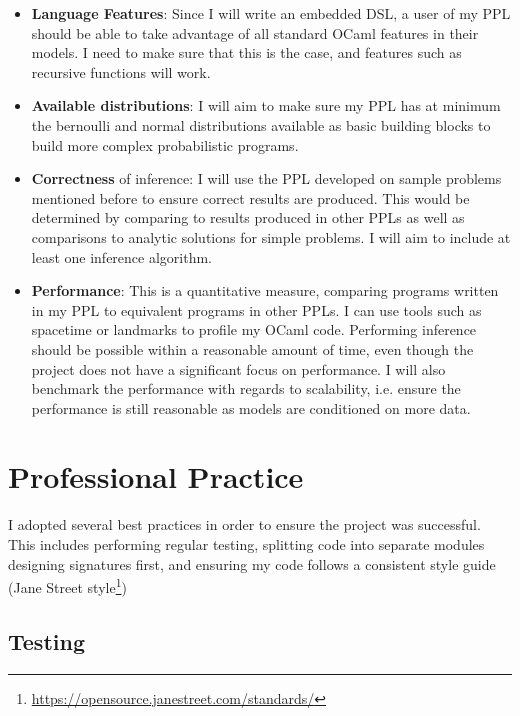 \begin{itemize}
    \item \textbf{Language Features}: Since I will write an embedded DSL, a user of my PPL should be able to take advantage of all standard OCaml features in their models. I need to make sure that this is the case, and features such as recursive functions will work.
    \item \textbf{Available distributions}: I will aim to make sure my PPL has at minimum the bernoulli and normal distributions available as basic building blocks to build more complex probabilistic programs.
    \item \textbf{Correctness} of inference: I will use the PPL developed on sample problems mentioned before to ensure correct results are produced. This would be determined by comparing to results produced in other PPLs as well as comparisons to analytic solutions for simple problems. I will aim to include at least one inference algorithm.
    \item \textbf{Performance}: This is a quantitative measure, comparing programs written in my PPL to equivalent programs in other PPLs. I can use tools such as spacetime or landmarks to profile my OCaml code. Performing inference should be possible within a reasonable amount of time, even though the project does not have a significant focus on performance. I will also benchmark the performance with regards to scalability, i.e. ensure the performance is still reasonable as models are conditioned on more data.
\end{itemize}



\section{Professional Practice}

I adopted several best practices in order to ensure the project was successful. This includes performing regular testing, splitting code into separate modules designing signatures first, and ensuring my code follows a consistent style guide (Jane Street style\footnote{\url{https://opensource.janestreet.com/standards/}})

\subsection{Testing}


